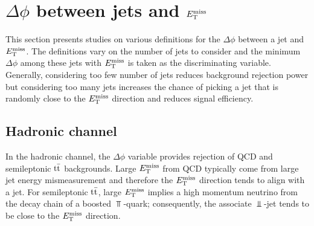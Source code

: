 \section{\texorpdfstring{$\Delta\phi$ between jets and $E_\mathrm{T}^{\mathrm{miss}}$}{dphi-jet-MET}}
\label{app:dphijetmet}

This section presents studies on various definitions for the $\Delta\phi$ between a jet and $E_\mathrm{T}^{\mathrm{miss}}$. The definitions vary on the number of jets to consider and the minimum $\Delta\phi$ among these jets with $E_\mathrm{T}^{\mathrm{miss}}$ is taken as the discriminating variable. Generally, considering too few number of jets reduces background rejection power but considering too many jets increases the chance of picking a jet that is randomly close to the $E_\mathrm{T}^{\mathrm{miss}}$ direction and reduces signal efficiency. 

\subsection{Hadronic channel}
In the hadronic channel, the $\Delta\phi$ variable provides rejection of QCD and semileptonic $\mathrm{t}\bar{\mathrm{t}}$ backgrounds. Large $E_\mathrm{T}^{\mathrm{miss}}$ from QCD typically come from large jet energy mismeasurement and therefore the $E_\mathrm{T}^{\mathrm{miss}}$ direction tends to align with a jet. For semileptonic $\mathrm{t}\bar{\mathrm{t}}$, large $E_\mathrm{T}^{\mathrm{miss}}$ implies a high momentum neutrino from the decay chain of a boosted $\Top$-quark; consequently, the associate $\Bot$-jet tends to be close to the $E_\mathrm{T}^{\mathrm{miss}}$ direction.

